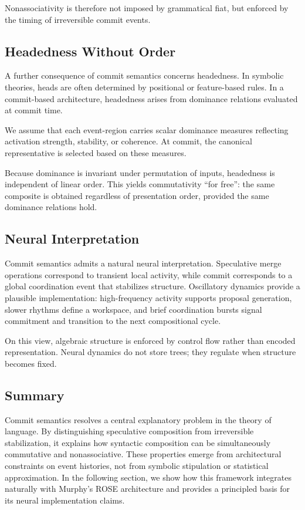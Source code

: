\documentclass[11pt]{article}
\begin{document}
Nonassociativity is therefore not imposed by grammatical fiat, but enforced by the timing of irreversible commit events.

\subsection{Headedness Without Order}

A further consequence of commit semantics concerns headedness. In symbolic theories, heads are often determined by positional or feature-based rules. In a commit-based architecture, headedness arises from dominance relations evaluated at commit time.

We assume that each event-region carries scalar dominance measures reflecting activation strength, stability, or coherence. At commit, the canonical representative is selected based on these measures.

Because dominance is invariant under permutation of inputs, headedness is independent of linear order. This yields commutativity “for free”: the same composite is obtained regardless of presentation order, provided the same dominance relations hold.

\subsection{Neural Interpretation}

Commit semantics admits a natural neural interpretation. Speculative merge operations correspond to transient local activity, while commit corresponds to a global coordination event that stabilizes structure. Oscillatory dynamics provide a plausible implementation: high-frequency activity supports proposal generation, slower rhythms define a workspace, and brief coordination bursts signal commitment and transition to the next compositional cycle.

On this view, algebraic structure is enforced by control flow rather than encoded representation. Neural dynamics do not store trees; they regulate when structure becomes fixed.

\subsection{Summary}

Commit semantics resolves a central explanatory problem in the theory of language. By distinguishing speculative composition from irreversible stabilization, it explains how syntactic composition can be simultaneously commutative and nonassociative. These properties emerge from architectural constraints on event histories, not from symbolic stipulation or statistical approximation. In the following section, we show how this framework integrates naturally with Murphy’s ROSE architecture and provides a principled basis for its neural implementation claims.
\end{document}
